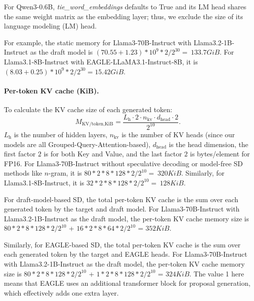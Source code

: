 For Qwen3-0.6B, \textit{tie\_word\_embeddings} defaults to True and its LM head shares the same weight matrix as the embedding layer; thus, we exclude the size of its language modeling (LM) head.

For example, the static memory for Llama3-70B-Instruct with Llama3.2-1B-Instruct as the draft model is $(70.55+1.23)*10^9*2/2^{30}=~133.7GiB$. For Llama3.1-8B-Instruct with EAGLE-LLaMA3.1-Instruct-8B, it is $(8.03+0.25)*10^9*2/2^{30}=15.42GiB$.

\paragraph{Per-token KV cache (KiB).}
To calculate the KV cache size of each generated token:
\[
M_\text{KV/token,KiB}=
\frac{L_\text{h}\cdot 2 \cdot n_\text{kv}\cdot d_\text{head}\cdot 2}{2^{10}} .
\]
$L_\text{h}$ is the number of hidden layers,
$n_\text{kv}$ is the number of KV heads (since our models are all Grouped-Query-Attention-based),
$d_\text{head}$ is the head dimension, the first factor $2$ is for both Key and Value, and the last factor $2$ is bytes/element for FP16. For Llama3-70B-Instruct without speculative decoding or model-free SD methods like $n$-gram, it is $80*2*8*128*2/2^{10}=~320KiB$. Similarly, for Llama3.1-8B-Instruct, it is $32*2*8*128*2/2^{10}=~128KiB$.

For draft-model-based SD, the total per-token KV cache is the sum over each generated token by the target and draft model. For Llama3-70B-Instruct with Llama3.2-1B-Instruct as the draft model, the per-token KV cache memory size is $80*2*8*128*2/2^{10}$ + $16*2*8*64*2/2^{10}$ = $352KiB$.

Similarly, for EAGLE-based SD, the total per-token KV cache is the sum over each generated token by the target and EAGLE heads. For Llama3-70B-Instruct with Llama3.2-1B-Instruct as the draft model, the per-token KV cache memory size is $80*2*8*128*2/2^{10}$ + $1*2*8*128*2/2^{10}$ = $324KiB$. The value 1 here means that EAGLE uses an additional transformer block for proposal generation, which effectively adds one extra layer.

